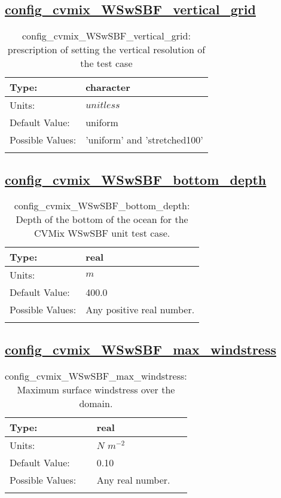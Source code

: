 \subsection[config\_cvmix\_WSwSBF\_vertical\_grid]{\hyperref[sec:nm_tab_cvmix_WSwSBF]{config\_cvmix\_WSwSBF\_vertical\_grid}}
\label{subsec:nm_sec_config_cvmix_WSwSBF_vertical_grid}
\begin{center}
\begin{longtable}{| p{2.0in} || p{4.0in} |}
    \hline
    Type: & character \\
    \hline
    Units: & $unitless$ \\
    \hline
    Default Value: & uniform \\
    \hline
    Possible Values: & 'uniform' and 'stretched100' \\
    \hline
    \caption{config\_cvmix\_WSwSBF\_vertical\_grid: prescription of setting the vertical resolution of the test case}
\end{longtable}
\end{center}
\subsection[config\_cvmix\_WSwSBF\_bottom\_depth]{\hyperref[sec:nm_tab_cvmix_WSwSBF]{config\_cvmix\_WSwSBF\_bottom\_depth}}
\label{subsec:nm_sec_config_cvmix_WSwSBF_bottom_depth}
\begin{center}
\begin{longtable}{| p{2.0in} || p{4.0in} |}
    \hline
    Type: & real \\
    \hline
    Units: & $m$ \\
    \hline
    Default Value: & 400.0 \\
    \hline
    Possible Values: & Any positive real number. \\
    \hline
    \caption{config\_cvmix\_WSwSBF\_bottom\_depth: Depth of the bottom of the ocean for the CVMix WSwSBF unit test case.}
\end{longtable}
\end{center}
\subsection[config\_cvmix\_WSwSBF\_max\_windstress]{\hyperref[sec:nm_tab_cvmix_WSwSBF]{config\_cvmix\_WSwSBF\_max\_windstress}}
\label{subsec:nm_sec_config_cvmix_WSwSBF_max_windstress}
\begin{center}
\begin{longtable}{| p{2.0in} || p{4.0in} |}
    \hline
    Type: & real \\
    \hline
    Units: & $N$ $m^{-2}$ \\
    \hline
    Default Value: & 0.10 \\
    \hline
    Possible Values: & Any real number. \\
    \hline
    \caption{config\_cvmix\_WSwSBF\_max\_windstress: Maximum surface windstress over the domain.}
\end{longtable}
\end{center}
